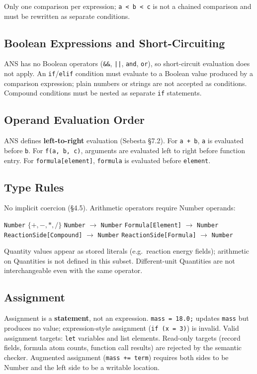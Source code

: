 \documentclass[11pt,a4paper]{article}
\newcommand{\code}[1]{\texttt{#1}}
\begin{document}
Only one comparison per expression; \code{a < b < c} is not a chained comparison and must be rewritten as separate conditions.

\subsection{Boolean Expressions and Short-Circuiting}
ANS has no Boolean operators (\code{\&\&}, \code{||}, \code{and}, \code{or}), so short-circuit evaluation does not apply. An \code{if}/\code{elif} condition must evaluate to a Boolean value produced by a comparison expression; plain numbers or strings are not accepted as conditions. Compound conditions must be nested as separate \code{if} statements.

\subsection{Operand Evaluation Order}
ANS defines \textbf{left-to-right} evaluation (Sebesta \S7.2). For \code{a + b}, \code{a} is evaluated before \code{b}. For \code{f(a, b, c)}, arguments are evaluated left to right before function entry. For \code{formula[element]}, \code{formula} is evaluated before \code{element}.

\subsection{Type Rules}
No implicit coercion (\S4.5). Arithmetic operators require Number operands:
\begin{center}
\code{Number} $\{+, -, *, /\}$ \code{Number} $\to$ \code{Number} \qquad
\code{Formula[Element]} $\to$ \code{Number} \\
\code{ReactionSide[Compound]} $\to$ \code{Number} \qquad
\code{ReactionSide[Formula]} $\to$ \code{Number}
\end{center}
Quantity values appear as stored literals (e.g.\ reaction energy fields); arithmetic on Quantities is not defined in this subset. Different-unit Quantities are not interchangeable even with the same operator.

\subsection{Assignment}
Assignment is a \textbf{statement}, not an expression. \code{mass = 18.0;} updates \code{mass} but produces no value; expression-style assignment (\code{if (x = 3)}) is invalid. Valid assignment targets: \code{let} variables and list elements. Read-only targets (record fields, formula atom counts, function call results) are rejected by the semantic checker. Augmented assignment (\code{mass += term}) requires both sides to be Number and the left side to be a writable location.
\end{document}
